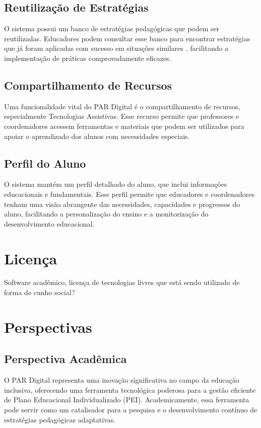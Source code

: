 \documentclass[sigconf]{webmedia}
\begin{document}
\subsection{Reutilização de Estratégias}
O sistema possui um banco de estratégias pedagógicas que podem ser 
reutilizadas. Educadores podem consultar esse banco para encontrar 
estratégias que já foram aplicadas com sucesso em situações similares
, facilitando a implementação de práticas comprovadamente eficazes.

\subsection{Compartilhamento de Recursos}
Uma funcionalidade vital do PAR Digital é o compartilhamento de 
recursos, especialmente Tecnologias Assistivas. Esse recurso 
permite que professores e coordenadores acessem ferramentas e 
materiais que podem ser utilizados para apoiar o aprendizado 
dos alunos com necessidades especiais.

\subsection{Perfil do Aluno}
O sistema mantém um perfil detalhado do aluno, que inclui informações
 educacionais e fundamentais. Esse perfil permite que educadores e 
 coordenadores tenham uma visão abrangente das necessidades, 
 capacidades e progressos do aluno, facilitando a personalização 
 do ensino e a monitorização do desenvolvimento educacional.



\section{Licença}
Software acadêmico, licença de tecnologias livres que está
 sendo utilizado de forma de cunho social?


\section{Perspectivas}

\subsection{Perspectiva Acadêmica}
O PAR Digital representa uma inovação significativa no campo 
da educação inclusiva, oferecendo uma ferramenta tecnológica 
poderosa para a gestão eficiente de Plano Educacional 
Individualizado (PEI). Academicamente, essa ferramenta pode 
servir como um catalisador para a pesquisa e o 
desenvolvimento contínuo de estratégias pedagógicas 
adaptativas. 
\end{document}

